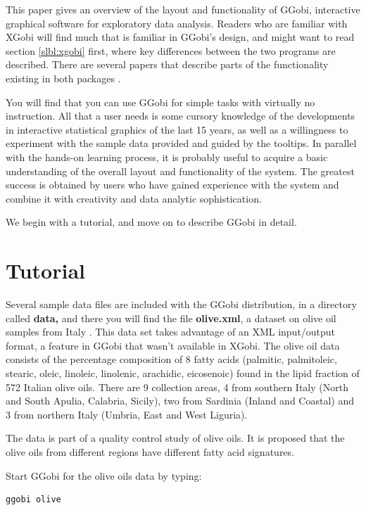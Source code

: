 \documentclass[11pt]{article}
\begin{document}
This paper gives an overview of the layout and functionality of GGobi,
interactive graphical software for exploratory data analysis.  Readers
who are familiar with XGobi will find much that is familiar in GGobi's
design, and might want to read section \ref{slbl:xgobi} first, where
key differences between the two programs are described. There are
several papers that describe parts of the functionality existing in
both packages
\cite{BCS95,SCB97,SB98,BAHM88,CBC93,CBCH95,CB95,BCAH95c}.

You will find that you can use GGobi for simple tasks with virtually
no instruction.  All that a user needs is some cursory knowledge of
the developments in interactive statistical graphics of the last 15
years, as well as a willingness to experiment with the sample data
provided and guided by the tooltips.  In parallel with the hands-on
learning process, it is probably useful to acquire a basic
understanding of the overall layout and functionality of the system.
The greatest success is obtained by users who have gained experience
with the system and combine it with creativity and data analytic
sophistication.

We begin with a tutorial, and move on to describe GGobi in detail.

\section{Tutorial}

Several sample data files are included with the GGobi distribution, in
a directory called {\bf data,} and there you will find the file {\bf
olive.xml}, a dataset on olive oil samples from Italy \cite{FALT83}.
This data set takes advantage of an XML input/output format, a feature
in GGobi that wasn't available in XGobi.  The olive oil data consists
of the percentage composition of 8 fatty acids (palmitic, palmitoleic,
stearic, oleic, linoleic, linolenic, arachidic, eicosenoic) found in the
lipid fraction of 572 Italian olive oils. There are 9 collection areas,
4 from southern Italy (North and South Apulia, Calabria, Sicily), two
from Sardinia (Inland and Coastal) and 3 from northern Italy (Umbria,
East and West Liguria).

The data is part of a quality control study of olive oils. It is proposed
that the olive oils from different regions have different fatty acid
signatures.

Start GGobi for the olive oils data by typing:

\begin{verbatim}
ggobi olive
\end{verbatim}
\end{document}

